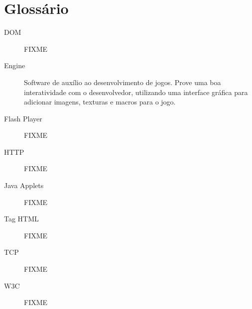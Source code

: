
\section*{Glossário}

\begin{description}
\item[DOM ] FIXME
\item[Engine ] Software de auxílio ao desenvolvimento de jogos. Prove
uma boa interatividade com o desenvolvedor, utilizando uma interface
gráfica para adicionar imagens, texturas e macros para o jogo.
\item[Flash Player ] FIXME
\item[HTTP ] FIXME
\item[Java Applets ] FIXME
\item[Tag HTML ] FIXME
\item[TCP ] FIXME
\item[W3C ] FIXME

\end{description}

\newpage
